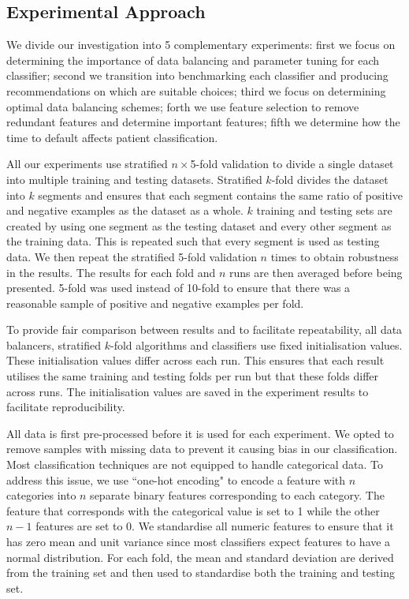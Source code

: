 \documentclass{sig-alternate-05-2015}
\begin{document}
	\subsection{Experimental Approach}
	\label{method-approach}
	We divide our investigation into 5 complementary experiments: first we focus on determining the importance of data balancing and parameter tuning for each classifier; second we transition into benchmarking each classifier and producing recommendations on which are suitable choices; third  we focus on determining optimal data balancing schemes; forth we use feature selection to remove redundant features and determine important features; fifth we determine how the time to default affects patient classification.
	
	All our experiments use stratified $n\times$5-fold validation to divide a single dataset into multiple training and testing datasets. Stratified $k$-fold divides the dataset into $k$ segments and ensures that each segment contains the same ratio of positive and negative examples as the dataset as a whole. $k$ training and testing sets are created by using one segment as the testing dataset and every other segment as the training data. This is repeated such that every segment is used as testing data. We then repeat the stratified 5-fold validation $n$ times to obtain robustness in the results. The results for each fold and $n$ runs are then averaged before being presented. 5-fold was used instead of 10-fold to ensure that there was a reasonable sample of positive and negative examples per fold.
	
	To provide fair comparison between results and to facilitate repeatability, all data balancers, stratified $k$-fold algorithms and classifiers use fixed initialisation values. These initialisation values differ across each run. This ensures that each result utilises the same training and testing folds per run but that these folds differ across runs. The initialisation values are saved in the experiment results to facilitate reproducibility.
	
	All data is first pre-processed before it is used for each experiment. We opted to remove samples with missing data to prevent it causing bias in our classification. Most classification techniques are not equipped to handle categorical data. To address this issue, we use ``one-hot encoding" to encode a feature with $n$ categories into $n$ separate binary features corresponding to each category. The feature that corresponds with the categorical value is set to 1 while the other $n-1$ features are set to 0. We standardise all numeric features to ensure that it has zero mean and unit variance since most classifiers expect features to have a normal distribution. For each fold, the mean and standard deviation are derived from the training set and then used to standardise both the training and testing set. 
	
\end{document}
